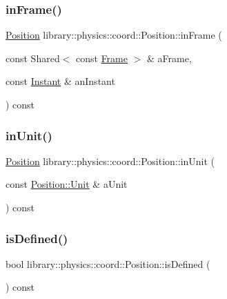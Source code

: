 \subsubsection{\texorpdfstring{in\+Frame()}{inFrame()}}
{\footnotesize\ttfamily \hyperlink{classlibrary_1_1physics_1_1coord_1_1_position}{Position} library\+::physics\+::coord\+::\+Position\+::in\+Frame (\begin{DoxyParamCaption}\item[{const Shared$<$ const \hyperlink{classlibrary_1_1physics_1_1coord_1_1_frame}{Frame} $>$ \&}]{a\+Frame,  }\item[{const \hyperlink{classlibrary_1_1physics_1_1time_1_1_instant}{Instant} \&}]{an\+Instant }\end{DoxyParamCaption}) const}

\mbox{\label{classlibrary_1_1physics_1_1coord_1_1_position_a908878d741ad2de6a2d278d2d674e949}} 
\subsubsection{\texorpdfstring{in\+Unit()}{inUnit()}}
{\footnotesize\ttfamily \hyperlink{classlibrary_1_1physics_1_1coord_1_1_position}{Position} library\+::physics\+::coord\+::\+Position\+::in\+Unit (\begin{DoxyParamCaption}\item[{const \hyperlink{classlibrary_1_1physics_1_1units_1_1_length_a3b8b39cd245cf6b19dc34459baeccb18}{Position\+::\+Unit} \&}]{a\+Unit }\end{DoxyParamCaption}) const}

\mbox{\label{classlibrary_1_1physics_1_1coord_1_1_position_ac13492ffe13b093bb26173089db1a24b}} 
\subsubsection{\texorpdfstring{is\+Defined()}{isDefined()}}
{\footnotesize\ttfamily bool library\+::physics\+::coord\+::\+Position\+::is\+Defined (\begin{DoxyParamCaption}{ }\end{DoxyParamCaption}) const}

